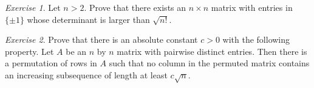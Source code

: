 \documentclass{article}
\theoremstyle{definition}
\theoremstyle{remark}
\newtheorem{exercise}{Exercise}
\begin{document}
\begin{exercise}
Let $n>2$. Prove that there exists an $n\times n$ matrix with entries in $\{\pm 1\}$ whose determinant is larger than $\sqrt{n!}$.
\end{exercise}

\begin{exercise}
Prove that there is an absolute constant $c>0$ with the following property. Let $A$ be an $n$ by $n$ matrix with pairwise distinct entries. Then there is a permutation of rows in $A$ such that no column in the permuted matrix contains an increasing subsequence of length at least $c\sqrt{n}$.
\end{exercise}
\end{document}
